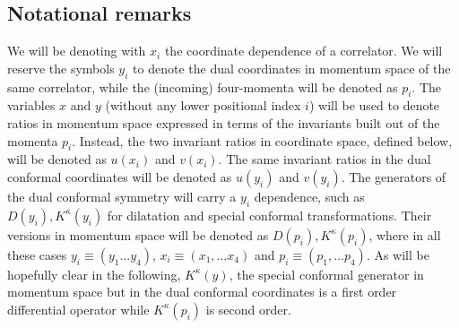 \documentclass[a4paper,11pt,openright,twoside]{book}
\numberwithin{equation}{section}
\begin{document}
{\subsection{Notational remarks} 
We will be denoting with $x_i$ the coordinate dependence of a correlator. We will reserve the symbols $y_i$ to denote the dual coordinates in momentum space of the same correlator, while the (incoming) four-momenta will be denoted as $p_i$. The variables $x$ and $y$ (without any lower positional index $i$) will be used to denote ratios in momentum space expressed in terms of the invariants built out of the momenta $p_i$. Instead, the two invariant ratios in coordinate space, defined below, will be denoted as $u(x_i)$ and $v(x_i)$. The same invariant ratios in the dual conformal coordinates will be denoted as $u(y_i)$ and $v(y_i)$. The generators of the dual conformal symmetry will carry a $y_i$ dependence, such as $D(y_i), K^\kappa(y_i)$ for dilatation and special conformal transformations. Their versions in momentum space will be denoted as $D(p_i), K^\kappa(p_i)$, where in all these cases $y_i\equiv(y_1\ldots y_4)$, $x_i\equiv(x_1,\ldots x_4)$ and $p_i\equiv (p_1,\ldots p_4)$. As will be hopefully clear in the following, $K^\kappa(y)$, the special conformal generator in momentum space but in the dual conformal coordinates is a first order differential operator while $K^\kappa(p_i)$ is second order. 
}
\end{document}
